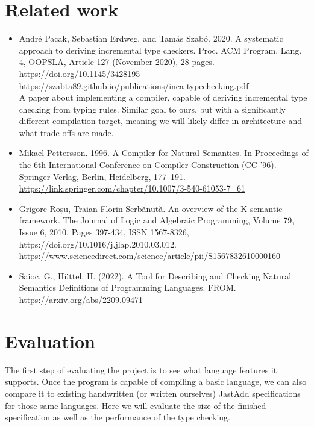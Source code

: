 \documentclass{article}
\begin{document}
\section{Related work}
\begin{itemize}
  \item
    André Pacak, Sebastian Erdweg, and Tamás Szabó. 2020. A systematic approach to deriving incremental type checkers. Proc. ACM Program. Lang. 4, OOPSLA, Article 127 (November 2020), 28 pages. https://doi.org/10.1145/3428195 \\
    \url{https://szabta89.github.io/publications/inca-typechecking.pdf} \\
    A paper about implementing a compiler, capable of deriving incremental type checking from typing rules.
    Similar goal to ours, but with a significantly different compilation target, meaning we will likely differ in architecture and what trade-offs are made.

  \item
    Mikael Pettersson. 1996. A Compiler for Natural Semantics. In Proceedings of the 6th International Conference on Compiler Construction (CC '96). Springer-Verlag, Berlin, Heidelberg, 177–191. \\
    \url{https://link.springer.com/chapter/10.1007/3-540-61053-7\_61} \\

  \item
    Grigore Roșu, Traian Florin Șerbănută. An overview of the K semantic framework.
The Journal of Logic and Algebraic Programming, Volume 79, Issue 6, 2010, Pages 397-434, ISSN 1567-8326, https://doi.org/10.1016/j.jlap.2010.03.012. \\
    \url{https://www.sciencedirect.com/science/article/pii/S1567832610000160} \\

  \item
    Saioc, G., Hüttel, H. (2022). A Tool for Describing and Checking Natural Semantics Definitions of Programming Languages. FROM. \\
    \url{https://arxiv.org/abs/2209.09471}

\end{itemize}


\section{Evaluation}
The first step of evaluating the project is to see what language features it supports. %
Once the program is capable of compiling a basic language, we can also compare it to existing handwritten (or written ourselves) JastAdd specifications for those same languages.
Here we will evaluate the size of the finished specification as well as the performance of the type checking.
\end{document}
